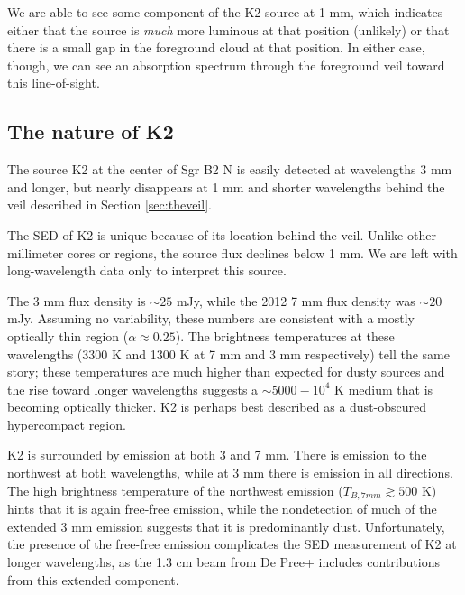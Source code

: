 \documentclass[twocolumn]{aastex61}
\begin{document}
We are able to see some component of the K2 source at 1 mm, which indicates
either that the source is \emph{much} more luminous at that position (unlikely)
or that there is a small gap in the foreground cloud at that position.
In either case, though, we can see an absorption spectrum through the foreground
veil toward this line-of-sight.





\subsection{The nature of K2}
\label{sec:natureofk2}
The source K2 at the center of Sgr B2 N is easily detected at wavelengths 3 mm
and longer, but nearly disappears at 1 mm and shorter wavelengths behind the
veil described in Section \ref{sec:theveil}.

The SED of K2 is unique because of its location behind the veil.  Unlike other
millimeter cores or \hii regions, the source flux declines below 1 mm.  We are
left with long-wavelength data only to interpret this source.

The 3 mm flux density is $\sim25$ mJy, while the 2012 7 mm flux density was
$\sim20$ mJy.  Assuming no variability, these numbers are consistent with a
mostly optically thin \hii region ($\alpha\approx0.25$).  The brightness
temperatures at these wavelengths (3300 K and 1300 K at 7 mm and 3 mm
respectively) tell the same story; these temperatures are much higher than
expected for dusty sources and the rise toward longer wavelengths suggests a
$\sim5000-10^4$ K medium that is becoming optically thicker.
K2 is perhaps best described as a dust-obscured hypercompact \hii region.

K2 is surrounded by emission at both 3 and 7 mm.  There is emission to the
northwest at both wavelengths, while at 3 mm there is emission in all
directions.  The high brightness temperature of the northwest emission ($T_{B,7
mm}\gtrsim500$ K) hints that it is again free-free emission, while the
nondetection of much of the extended 3 mm emission suggests that it is
predominantly dust.  Unfortunately, the presence of the free-free emission complicates
the SED measurement of K2 at longer wavelengths, as the 1.3 cm beam from De Pree+
includes contributions from this extended component.
\end{document}
